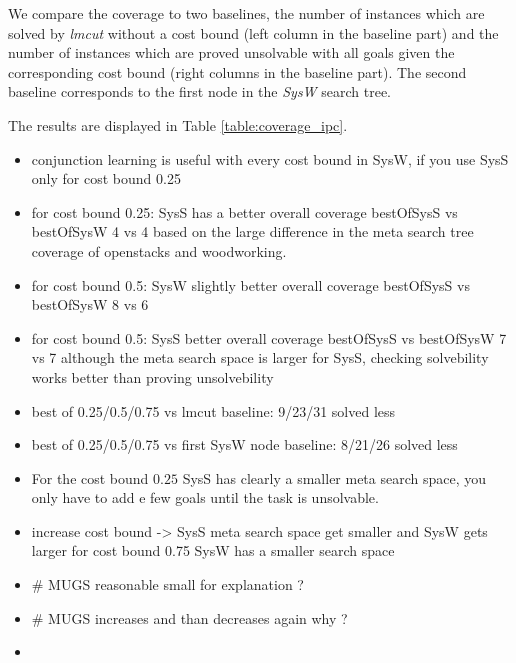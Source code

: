 We compare the coverage to two baselines, the number of instances which are solved by \emph{lmcut} without
a cost bound (left column in the baseline part) and the number of instances which are proved
unsolvable with all goals given the corresponding cost bound (right columns in the baseline part). 
The second baseline corresponds to the first node in the \emph{SysW} search tree.


The results are displayed in Table \ref{table:coverage_ipc}.

\begin{itemize}
	\item conjunction learning is useful with every cost bound in SysW,
		if you use SysS only for cost bound 0.25
	\item for cost bound 0.25: SysS has a better overall coverage 
		bestOfSysS vs bestOfSysW 4 vs 4
		based on the large difference in the meta search tree coverage of openstacks and woodworking.
	\item for cost bound 0.5: SysW slightly better overall coverage 
		bestOfSysS vs bestOfSysW 8 vs 6
	\item for cost bound 0.5: SysS  better overall coverage 
		bestOfSysS vs bestOfSysW 7 vs 7
		although the meta search space is larger for SysS, checking solvebility
		works better than proving unsolvebility
	\item best of 0.25/0.5/0.75 vs lmcut baseline: 9/23/31 solved less
	\item best of 0.25/0.5/0.75 vs first SysW node baseline: 8/21/26 solved less
	\item  For the cost bound $0.25$ SysS has clearly a smaller 
		meta search space, you only have to add e few goals until the task is unsolvable. 
	\item increase cost bound -> SysS meta search space get smaller and SysW gets larger
		for cost bound 0.75 SysW has a smaller search space
	\item \# MUGS reasonable small for explanation ?
	\item \# MUGS increases and than decreases again why ?
	\item {}
\end{itemize}




\setlength{\tabcolsep}{2pt}
\renewcommand{\arraystretch}{0.8}
\begin{figure*}[ht]
	\tiny
	\centering  
	\caption{
		Benchmark: oversubscription IPC
		domains with bound $ = x \cdot $ optimal cost with $
		x \in \{0.25, 0.5, 0.75\}$, solvable with lmcut with no cost bound in 
		30 min and with less then 31 goal facts(limitation of implementation).
	}
	\label{table:coverage_ipc}
\end{figure*}



